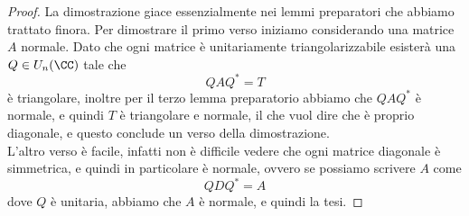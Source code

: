 \documentclass[11pt]{scrartcl}
\begin{document}
   	 \begin{proof}
   	 	La dimostrazione giace essenzialmente nei lemmi preparatori che abbiamo trattato finora. Per dimostrare il primo verso iniziamo considerando una matrice $A$ normale. Dato che ogni matrice è unitariamente triangolarizzabile esisterà una $Q\in U_n(\CC)$ tale che 
   	 	$$QAQ^*=T$$
   	 	è triangolare, inoltre per il terzo lemma preparatorio abbiamo che $QAQ^*$ è normale, e quindi $T$ è triangolare e normale, il che vuol dire che è proprio diagonale, e questo conclude un verso della dimostrazione. \\
   	 	L'altro verso è facile, infatti non è difficile vedere che ogni matrice diagonale è simmetrica, e quindi in particolare è normale, ovvero se possiamo scrivere $A$ come 
   	 	$$QDQ^*=A$$
   	 	dove $Q$ è unitaria, abbiamo che $A$ è normale, e quindi la tesi.
   	 \end{proof}
\end{document}

